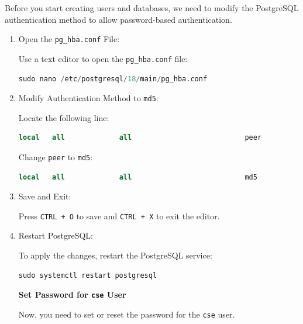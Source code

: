 \documentclass[12pt,a4paper]{article}
\begin{document}
\noindent Before you start creating users and databases, we need to modify the PostgreSQL authentication method to allow password-based authentication.
\begin{enumerate}
    \item Open the \texttt{pg\_hba.conf} File:

   Use a text editor to open the \texttt{pg\_hba.conf} file:

   \begin{lstlisting}[language=SQL]
   sudo nano /etc/postgresql/18/main/pg_hba.conf
   \end{lstlisting}



\item Modify Authentication Method to \texttt{md5}:

   Locate the following line:

   \begin{lstlisting}[language=SQL]
   local   all             all                           peer
   \end{lstlisting}

   Change \texttt{peer} to \texttt{md5}:

   \begin{lstlisting}[language=SQL]
   local   all             all                           md5
   \end{lstlisting}

\item Save and Exit:

   Press \texttt{CTRL + O} to save and \texttt{CTRL + X} to exit the editor.

\item Restart PostgreSQL:

   To apply the changes, restart the PostgreSQL service:

   \begin{lstlisting}[language=SQL]
   sudo systemctl restart postgresql
   \end{lstlisting}

\textbf{Set Password for \texttt{cse} User}

Now, you need to set or reset the password for the \texttt{cse} user. 


\end{enumerate}
\end{document}
